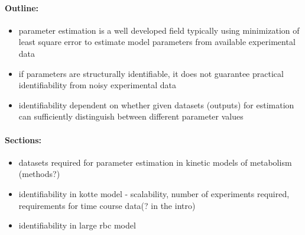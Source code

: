 \documentclass[10pt]{article}
\begin{document}
	\paragraph{Outline:}
	\begin{itemize}
		\item parameter estimation is a well developed field typically using minimization of least square error to estimate model parameters from available experimental data
		\item if parameters are structurally identifiable, it does not guarantee practical identifiability from noisy experimental data
		\item identifiability dependent on whether given datasets (outputs) for estimation can sufficiently distinguish between different parameter values
	\end{itemize}
	
	\paragraph{Sections:}
	\begin{itemize}
		\item datasets required for parameter estimation in kinetic models of metabolism (methods?)		
		\item identifiability in kotte model - scalability, number of experiments required, requirements for time course data(? in the intro)		
		\item identifiability in large rbc model
	\end{itemize}
	
	\printbibliography
\end{document}

